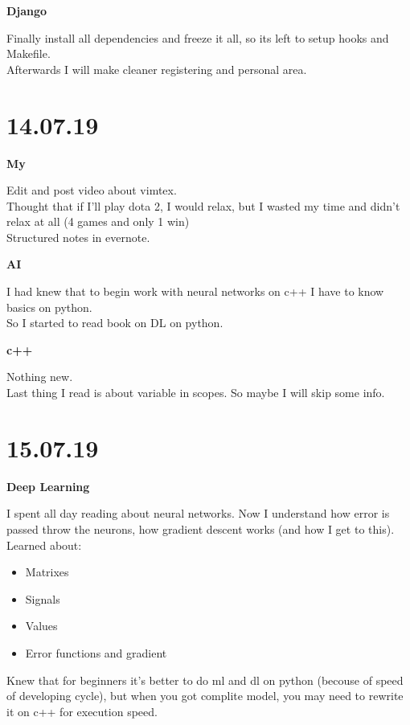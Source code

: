 \documentclass[12pt,a4paper,titlepage]{article}
\begin{document}
\begin{center}
    \large \textbf{Django}
\end{center}
Finally install all dependencies and freeze it all, so its left to setup hooks and Makefile. \\
Afterwards I will make cleaner registering and personal area.

\newpage
\section{14.07.19}

\begin{center}
    \large \textbf{My}
\end{center}
Edit and post video about vimtex.\\
Thought that if I'll play dota 2, I would relax, but I wasted my time and didn't relax at all (4 games and only 1 win)\\
Structured notes in evernote.

\begin{center}
    \large \textbf{AI}
\end{center}
I had knew that to begin work with neural networks on c++ I have to know basics on python.\\
So I started to read book on DL on python.

\begin{center}
    \large \textbf{c++}
\end{center}
Nothing new.\\Last thing I read is about variable in scopes. So maybe I will skip some info.

\newpage
\section{15.07.19}

\begin{center}
    \large \textbf{Deep Learning}
\end{center}
I spent all day reading about neural networks. Now I understand how error is passed throw the neurons, how gradient descent works (and how I get to this).\\
Learned about:
\begin{itemize}
    \item{Matrixes}
    \item{Signals}
    \item{Values}
    \item{Error functions and gradient}
\end{itemize}
Knew that for beginners it's better to do ml and dl on python (becouse of speed of developing cycle), but when you got complite model, you may need to rewrite it on c++ for execution speed.
\end{document}
